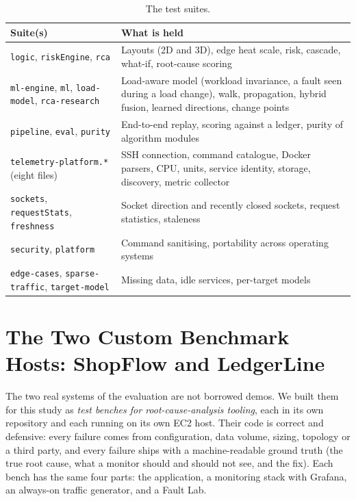 \begin{table}[!htbp]
\centering
\caption{The test suites.}
\label{tab:tests}
\small
\renewcommand{\arraystretch}{1.2}
\begin{tabularx}{\textwidth}{>{\raggedright\arraybackslash}p{5.3cm}>{\raggedright\arraybackslash}X}
\toprule
\textbf{Suite(s)} & \textbf{What is held}\\
\midrule
\texttt{logic}, \texttt{riskEngine}, \texttt{rca} & Layouts (2D and 3D), edge heat scale, risk, cascade, what-if, root-cause scoring\\
\texttt{ml-engine}, \texttt{ml}, \texttt{load-model}, \texttt{rca-research} & Load-aware model (workload invariance, a fault seen during a load change), walk, propagation, hybrid fusion, learned directions, change points\\
\texttt{pipeline}, \texttt{eval}, \texttt{purity} & End-to-end replay, scoring against a ledger, purity of algorithm modules\\
\texttt{telemetry-platform.*} (eight files) & SSH connection, command catalogue, Docker parsers, CPU, units, service identity, storage, discovery, metric collector\\
\texttt{sockets}, \texttt{requestStats}, \texttt{freshness} & Socket direction and recently closed sockets, request statistics, staleness\\
\texttt{security}, \texttt{platform} & Command sanitising, portability across operating systems\\
\texttt{edge-cases}, \texttt{sparse-traffic}, \texttt{target-model} & Missing data, idle services, per-target models\\
\bottomrule
\end{tabularx}
\end{table}

\section{The Two Custom Benchmark Hosts: ShopFlow and LedgerLine}
\label{sec:benches}
The two real systems of the evaluation are not borrowed demos. We built them for this study as \emph{test benches for root-cause-analysis tooling}, each in its own repository and each running on its own EC2 host. Their code is correct and defensive: every failure comes from configuration, data volume, sizing, topology or a third party, and every failure ships with a machine-readable ground truth (the true root cause, what a monitor should and should not see, and the fix). Each bench has the same four parts: the application, a monitoring stack with Grafana, an always-on traffic generator, and a Fault Lab.

